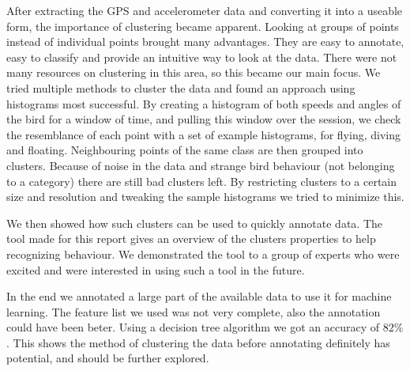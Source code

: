 After extracting the GPS and accelerometer data and converting it into a useable form, the importance of clustering became apparent. Looking at groups of points instead of individual points brought many advantages. They are easy to annotate, easy to classify and provide an intuitive way to look at the data. There were not many resources on clustering in this area, so this became our main focus. We tried multiple methods to cluster the data and found an approach using histograms most successful. By creating a histogram of both speeds and angles of the bird for a window of time, and pulling this window over the session, we check the resemblance of each point with a set of example histograms, for flying, diving and floating. Neighbouring points of the same class are then grouped into clusters. Because of noise in the data and strange bird behaviour (not belonging to a category) there are still bad clusters left. By restricting clusters to a certain size and resolution and tweaking the sample histograms we tried to minimize this. 

We then showed how such clusters can be used to quickly annotate data. The tool made for this report gives an overview of the clusters properties to help recognizing behaviour. We demonstrated the tool to a group of experts who were excited and were interested in using such a tool in the future.

In the end we annotated a large part of the available data to use it for machine learning. The feature list we used was not very complete, also the annotation could have been beter. Using a decision tree algorithm we got an accuracy of $82\%$. This shows the method of clustering the data before annotating definitely has potential, and should be further explored.